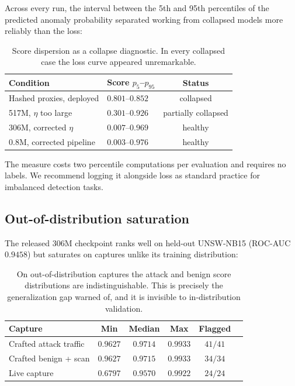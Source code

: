\documentclass[11pt]{article}
\begin{document}
Across every run, the interval between the 5th and 95th percentiles of the
predicted anomaly probability separated working from collapsed models more
reliably than the loss:

\begin{table}[h]
\centering
\begin{tabular}{llc}
\toprule
Condition & Score $p_5$--$p_{95}$ & Status \\
\midrule
Hashed proxies, deployed & $0.801$--$0.852$ & collapsed \\
517M, $\eta$ too large & $0.301$--$0.926$ & partially collapsed \\
306M, corrected $\eta$ & $0.007$--$0.969$ & healthy \\
0.8M, corrected pipeline & $0.003$--$0.976$ & healthy \\
\bottomrule
\end{tabular}
\caption{Score dispersion as a collapse diagnostic. In every collapsed case the
loss curve appeared unremarkable.}
\label{tab:dispersion}
\end{table}

The measure costs two percentile computations per evaluation and requires no
labels. We recommend logging it alongside loss as standard practice for
imbalanced detection tasks.

\subsection{Out-of-distribution saturation}

The released 306M checkpoint ranks well on held-out UNSW-NB15
(ROC-AUC $0.9458$) but saturates on captures unlike its training distribution:

\begin{table}[h]
\centering
\begin{tabular}{lccccc}
\toprule
Capture & Min & Median & Max & Flagged \\
\midrule
Crafted attack traffic & $0.9627$ & $0.9714$ & $0.9933$ & $41/41$ \\
Crafted benign + scan & $0.9627$ & $0.9715$ & $0.9933$ & $34/34$ \\
Live capture & $0.6797$ & $0.9570$ & $0.9922$ & $24/24$ \\
\bottomrule
\end{tabular}
\caption{On out-of-distribution captures the attack and benign score
distributions are indistinguishable. This is precisely the generalization gap
\citet{sommer2010outside} warned of, and it is invisible to in-distribution
validation.}
\label{tab:ood}
\end{table}
\end{document}
